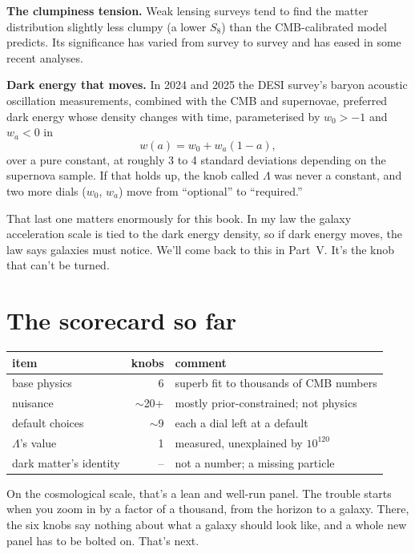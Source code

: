 \textbf{The clumpiness tension.} Weak lensing surveys tend to find the matter distribution slightly less clumpy (a lower $S_8$) than the CMB-calibrated model predicts. Its significance has varied from survey to survey and has eased in some recent analyses.

\textbf{Dark energy that moves.} In 2024 and 2025 the DESI survey's baryon acoustic oscillation measurements, combined with the CMB and supernovae, preferred dark energy whose density changes with time, parameterised by $w_0>-1$ and $w_a<0$ in
\begin{equation}
w(a)=w_0+w_a(1-a),
\end{equation}
over a pure constant, at roughly 3 to 4 standard deviations depending on the supernova sample. If that holds up, the knob called $\Lambda$ was never a constant, and two more dials ($w_0$, $w_a$) move from ``optional'' to ``required.''




That last one matters enormously for this book. In my law the galaxy acceleration scale is tied to the dark energy density, so if dark energy moves, the law says galaxies must notice. We'll come back to this in Part~V. It's the knob that can't be turned.

\section{The scorecard so far}

\begin{center}
\begin{tabular}{lrl}
\toprule
item & knobs & comment\\
\midrule
base physics & 6 & superb fit to thousands of CMB numbers\\
nuisance & $\sim$20+ & mostly prior-constrained; not physics\\
default choices & $\sim$9 & each a dial left at a default\\
$\Lambda$'s value & 1 & measured, unexplained by $10^{120}$\\
dark matter's identity & -- & not a number; a missing particle\\
\bottomrule
\end{tabular}
\end{center}

On the cosmological scale, that's a lean and well-run panel. The trouble starts when you zoom in by a factor of a thousand, from the horizon to a galaxy. There, the six knobs say nothing about what a galaxy should look like, and a whole new panel has to be bolted on. That's next.
